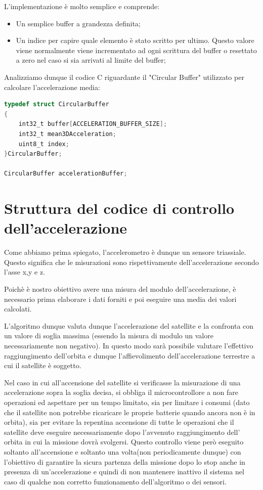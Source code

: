 \documentclass[LaM,binding=0.6cm]{../sapthesis}
\begin{document}
L'implementazione è molto semplice e comprende:
\begin{itemize}
    \item Un semplice buffer a grandezza definita;
    
    \item Un indice per capire quale elemento è stato scritto per ultimo. Questo valore viene normalmente viene incrementato ad ogni scrittura del buffer o resettato a zero nel caso si sia arrivati al limite del buffer;
\end{itemize}

\newline

Analizziamo dunque il codice C riguardante il "Circular Buffer" utilizzato per calcolare l'accelerazione media:

\begin{lstlisting}[language=C]
typedef struct CircularBuffer
{
    int32_t buffer[ACCELERATION_BUFFER_SIZE];
    int32_t mean3DAcceleration;
    uint8_t index;
}CircularBuffer;

CircularBuffer accelerationBuffer;
\end{lstlisting}

\section{Struttura del codice di controllo dell'accelerazione}
Come abbiamo prima spiegato, l'accelerometro è dunque un sensore triassiale. Questo significa che  le misurazioni sono rispettivamente dell'accelerazione secondo l'asse x,y e z.

Poichè è nostro obiettivo avere una misura del modulo dell’accelerazione, è necessario prima elaborare i dati forniti e poi eseguire una media dei valori calcolati. 

L’algoritmo dunque valuta dunque l’accelerazione del satellite e la confronta con un valore di soglia massima (essendo la misura di modulo un valore necessariamente non negativo).
In questo modo sarà possibile valutare l’effettivo raggiungimento dell’orbita e dunque l’affievolimento dell’accelerazione terrestre a cui il satellite è soggetto.

Nel caso in cui all’accensione del satellite si verificasse la misurazione di una accelerazione sopra la soglia decisa, si obbliga il microcontrollore a non fare operazioni ed aspettare per un tempo limitato, sia per limitare i consumi (dato che il satellite non potrebbe ricaricare le proprie batterie quando ancora non è in orbita), sia per evitare la repentina accensione di tutte le operazioni che il satellite deve eseguire necessariamente dopo l’avvenuto raggiungimento dell’ orbita in cui la missione dovrà svolgersi. 
Questo controllo viene però eseguito soltanto all’accensione e soltanto una volta(non periodicamente dunque) con l’obiettivo di garantire la sicura partenza della missione dopo lo stop anche in presenza di un’accelerazione e quindi di non mantenere inattivo il sistema nel caso di qualche non corretto funzionamento dell’algoritmo o dei sensori.
\end{document}
